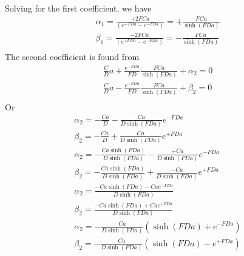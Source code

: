 \documentclass[11pt]{article}
\begin{document}
Solving for the first coefficient, we have
\begin{equation}\begin{aligned}
\alpha_1 = \frac{+2FCa}{(e^{+FD a} - e^{-FD a})} = +\frac{FCa}{\sinh(FD a)} \\
\beta_1  = \frac{-2FCa}{(e^{+FD a} - e^{-FD a})} = -\frac{FCa}{\sinh(FD a)} \\
\end{aligned} \end{equation}
The second coefficient is found from
\begin{equation}\begin{aligned}
	\frac{C}{D} a + \frac{e^{-FD a}}{FD} \frac{FCa}{\sinh(FD a)} +\alpha_2 = 0\\
	\frac{C}{D} a - \frac{e^{+FD a}}{FD} \frac{FCa}{\sinh(FD a)} +\beta_2  = 0\\
\end{aligned} \end{equation}
Or
\begin{equation}\begin{aligned}
	\alpha_2 = - \frac{Ca}{D} - \frac{Ca}{D\sinh(FD a)} e^{-FD a} \\
	\beta_2  = - \frac{Ca}{D} + \frac{Ca}{D\sinh(FD a)} e^{+FD a} \\
	\alpha_2 = - \frac{Ca\sinh(FD a)}{D\sinh(FD a)} - \frac{+Ca}{D\sinh(FD a)} e^{-FD a} \\
	\beta_2  = - \frac{Ca\sinh(FD a)}{D\sinh(FD a)} + \frac{-Ca}{D\sinh(FD a)} e^{+FD a} \\
	\alpha_2 =   \frac{-Ca\sinh(FD a) -Ca e^{-FD a}}{D\sinh(FD a)} \\
	\beta_2  =   \frac{-Ca\sinh(FD a) +Ca e^{+FD a}}{D\sinh(FD a)} \\
	\alpha_2 = - \frac{Ca}{D\sinh(FD a)} (\sinh(FD a) + e^{-FD a}) \\
	\beta_2  = - \frac{Ca}{D\sinh(FD a)} (\sinh(FD a) - e^{+FD a}) \\
\end{aligned} \end{equation}
\end{document}
